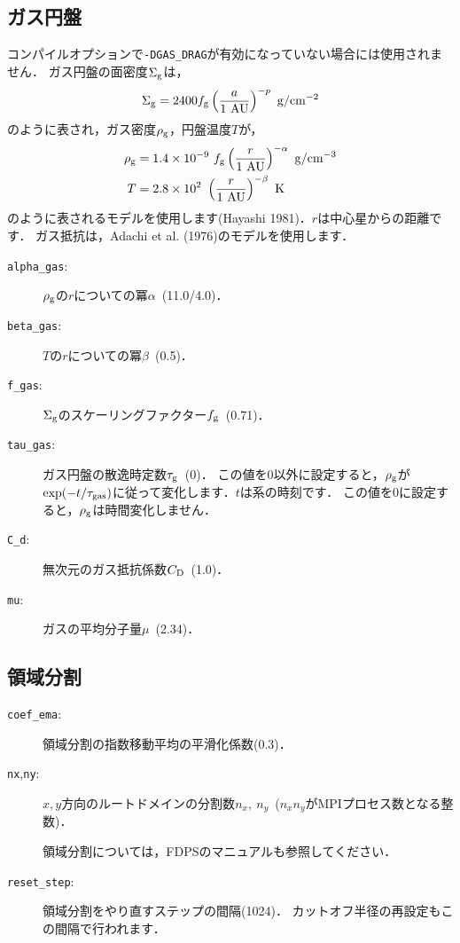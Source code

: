 \documentclass[12pt,a4paper,dvipdfmx]{jsarticle}
\begin{document}
\subsection{ガス円盤}
コンパイルオプションで\texttt{-DGAS\_DRAG}が有効になっていない場合には使用されません．
ガス円盤の面密度$\Sigma_{\rm g}$は，
\begin{equation}
\Sigma_{\rm g}=2400f_{\rm g}\left( \frac{a}{1\ {\rm AU}} \right)^{-p}\ {\rm g/cm^{-2}}\label{sigmag}
\end{equation}
のように表され，ガス密度$\rho_{\rm g}$，円盤温度$T$が，
\begin{align}
\rho_{\rm g}&=1.4\times 10^{-9}\ f_{\rm g}\left( \frac{r}{1\ {\rm AU}} \right)^{-\alpha}\ {\rm g/cm^{-3}}\\
T&=2.8\times 10^{2}\ \left( \frac{r}{1\ {\rm AU}} \right)^{-\beta}\ {\rm K}
\end{align}
のように表されるモデルを使用します(Hayashi 1981)．$r$は中心星からの距離です．
ガス抵抗は，Adachi et al. (1976)のモデルを使用します．

\begin{description}
\item[\texttt{alpha\_gas}:]
$\rho_{\rm g}$の$r$についての冪$\alpha$\ (11.0/4.0)．
\item[\texttt{beta\_gas}:]
$T$の$r$についての冪$\beta$\ (0.5)．
\item[\texttt{f\_gas}:]
$\Sigma_{\rm g}$のスケーリングファクター$f_{\rm g}$\ (0.71)．
\item[\texttt{tau\_gas}:]
ガス円盤の散逸時定数$\tau_{\rm g}$\ (0)．
この値を$0$以外に設定すると，$\rho_{\rm g}$が$\exp(-t/\tau_{\rm gas})$に従って変化します．$t$は系の時刻です．
この値を$0$に設定すると，$\rho_{\rm g}$は時間変化しません．
\item[\texttt{C\_d}:]
無次元のガス抵抗係数$C_{\rm D}$\ (1.0)．
\item[\texttt{mu}:]
ガスの平均分子量$\mu$\ (2.34)．
\end{description}

\subsection{領域分割}
\begin{description}
\item[\texttt{coef\_ema}:]
領域分割の指数移動平均の平滑化係数(0.3)．
\item[\texttt{nx},\texttt{ny}:]
$x,y$方向のルートドメインの分割数$n_{x},\ n_{y}$\ ($n_{x}n_{y}$がMPIプロセス数となる整数)．

領域分割については，FDPSのマニュアルも参照してください．
\item[\texttt{reset\_step}:]
領域分割をやり直すステップの間隔(1024)．%
カットオフ半径の再設定もこの間隔で行われます．
\end{description}
\end{document}
